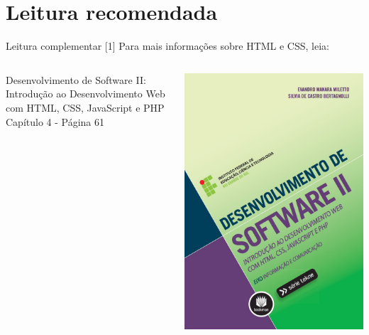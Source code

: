 \documentclass{beamer}
\begin{document}
\section{Leitura recomendada}
\begin{frame}{Leitura complementar [1]}
 Para mais informações sobre HTML e CSS, leia:\\
 \begin{columns}
   \begin{column}{0.5\textwidth}
    Desenvolvimento de Software II: Introdução ao Desenvolvimento Web com HTML, CSS, JavaScript e PHP \\
     Capítulo 4 - Página 61\\ 
      \cite{miletto2014desenvolvimento}
   \end{column}
   \begin{column}{0.3\textwidth}
    \begin{center}
  \includegraphics[height=0.45\paperheight]{fig/aula2/milleto2014.jpeg} \\
 \end{center}
   \end{column}
 \end{columns}
\end{frame}
\end{document}

